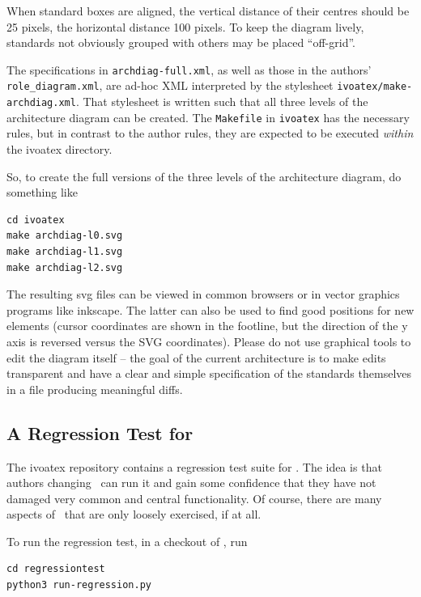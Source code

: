 \documentclass[11pt,a4paper]{ivoa}
\begin{document}
When standard boxes are aligned, the
vertical distance of their centres should be 25 pixels, the horizontal
distance 100 pixels.  To keep the diagram lively, standards not
obviously grouped with others may be placed ``off-grid''.

The specifications in \verb|archdiag-full.xml|, as well as those in
the authors' \verb|role_diagram.xml|, are ad-hoc XML interpreted by the
stylesheet \verb|ivoatex/make-archdiag.xml|.  That stylesheet is
written such that all three levels of the architecture diagram can be
created.  The \verb|Makefile| in \verb|ivoatex| has the necessary
rules, but in contrast to the author rules, they are expected to be
executed \emph{within} the ivoatex directory.

So, to create the full versions of the three levels of the architecture
diagram, do something like

\begin{lstlisting}
cd ivoatex
make archdiag-l0.svg
make archdiag-l1.svg
make archdiag-l2.svg
\end{lstlisting}

The resulting svg files can be viewed in common browsers or in vector
graphics programs like inkscape.  The latter can also be used to find
good positions for new elements (cursor coordinates are shown in the
footline, but the direction of the y axis is reversed versus the SVG
coordinates).  Please do not use graphical tools to edit the diagram
itself -- the goal of the current architecture is to make edits
transparent and have a clear and simple specification of the standards
themselves in a file producing meaningful diffs.

\subsection{A Regression Test for \ivoatex}

The ivoatex repository contains a regression test suite for
\ivoatex.  The idea is that authors changing \ivoatex~can run it and
gain some confidence that they have not damaged very common and central
functionality.  Of course, there are many aspects of \ivoatex~that are
only loosely exercised, if at all.

To run the regression test, in a checkout of \ivoatex, run

\begin{lstlisting}
cd regressiontest
python3 run-regression.py
\end{lstlisting}
\end{document}
